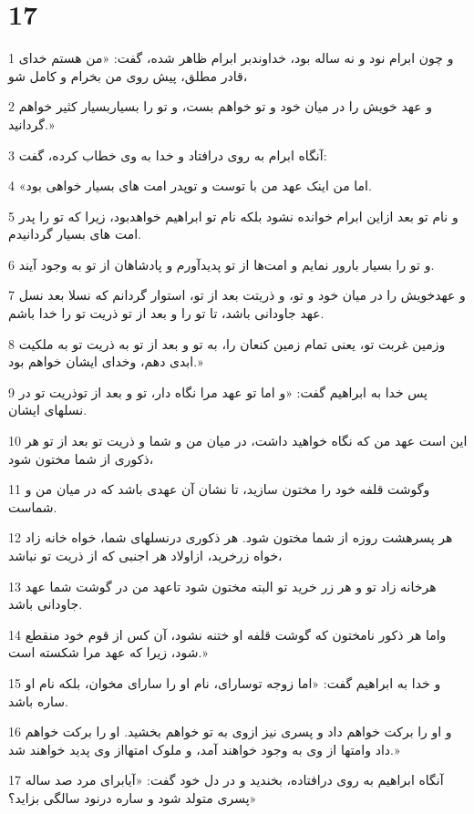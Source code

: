 \chapter{17}

\par 1 و چون ابرام نود و نه ساله بود، خداوندبر ابرام ظاهر شده، گفت: «من هستم خدای قادر مطلق، پیش روی من بخرام و کامل شو،
\par 2 و عهد خویش را در میان خود و تو خواهم بست، و تو را بسیاربسیار کثیر خواهم گردانید.»
\par 3 آنگاه ابرام به روی در‌افتاد و خدا به وی خطاب کرده، گفت:
\par 4 «اما من اینک عهد من با توست و توپدر امت های بسیار خواهی بود.
\par 5 و نام تو بعد ازاین ابرام خوانده نشود بلکه نام تو ابراهیم خواهدبود، زیرا که تو را پدر امت های بسیار گردانیدم.
\par 6 و تو را بسیار بارور نمایم و امت‌ها از تو پدیدآورم و پادشاهان از تو به وجود آیند. 
\par 7 و عهدخویش را در میان خود و تو، و ذریتت بعد از تو، استوار گردانم که نسلا بعد نسل عهد جاودانی باشد، تا تو را و بعد از تو ذریت تو را خدا باشم.
\par 8 وزمین غربت تو، یعنی تمام زمین کنعان را، به تو و بعد از تو به ذریت تو به ملکیت ابدی دهم، وخدای ایشان خواهم بود.»
\par 9 پس خدا به ابراهیم گفت: «و اما تو عهد مرا نگاه دار، تو و بعد از توذریت تو در نسلهای ایشان.
\par 10 این است عهد من که نگاه خواهید داشت، در میان من و شما و ذریت تو بعد از تو هر ذکوری از شما مختون شود،
\par 11 وگوشت قلفه خود را مختون سازید، تا نشان آن عهدی باشد که در میان من و شماست.
\par 12 هر پسرهشت روزه از شما مختون شود. هر ذکوری درنسلهای شما، خواه خانه زاد خواه زرخرید، ازاولاد هر اجنبی که از ذریت تو نباشد،
\par 13 هرخانه زاد تو و هر زر خرید تو البته مختون شود تاعهد من در گوشت شما عهد جاودانی باشد.
\par 14 واما هر ذکور نامختون که گوشت قلفه او ختنه نشود، آن کس از قوم خود منقطع شود، زیرا که عهد مرا شکسته است.»
\par 15 و خدا به ابراهیم گفت: «اما زوجه توسارای، نام او را سارای مخوان، بلکه نام او ساره باشد.
\par 16 و او را برکت خواهم داد و پسری نیز ازوی به تو خواهم بخشید. او را برکت خواهم داد وامتها از وی به وجود خواهند آمد، و ملوک امتهااز وی پدید خواهند شد.»
\par 17 آنگاه ابراهیم به روی در‌افتاده، بخندید و در دل خود گفت: «آیابرای مرد صد ساله پسری متولد شود و ساره درنود سالگی بزاید؟»
